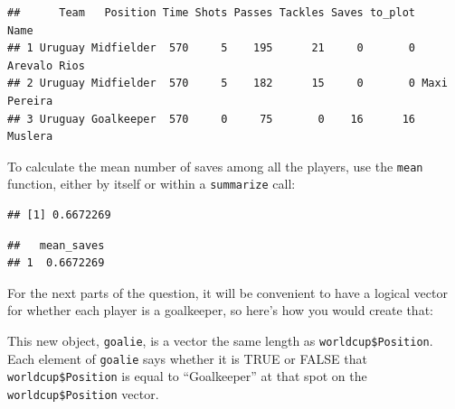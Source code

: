 \documentclass[]{book}
\makeatletter
\newenvironment{Shaded}{\begin{snugshade}}{\end{snugshade}}
\newcommand{\KeywordTok}[1]{\textcolor[rgb]{0.13,0.29,0.53}{\textbf{#1}}}
\newcommand{\DataTypeTok}[1]{\textcolor[rgb]{0.13,0.29,0.53}{#1}}
\newcommand{\StringTok}[1]{\textcolor[rgb]{0.31,0.60,0.02}{#1}}
\newcommand{\OperatorTok}[1]{\textcolor[rgb]{0.81,0.36,0.00}{\textbf{#1}}}
\newcommand{\NormalTok}[1]{#1}
\newenvironment{kframe}{%
\medskip{}
\setlength{\fboxsep}{.8em}
 \def\at@end@of@kframe{}%
 \ifinner\ifhmode%
  \def\at@end@of@kframe{\end{minipage}}%
  \begin{minipage}{\columnwidth}%
 \fi\fi%
 \def\FrameCommand##1{\hskip\@totalleftmargin \hskip-\fboxsep
 \colorbox{shadecolor}{##1}\hskip-\fboxsep
     \hskip-\linewidth \hskip-\@totalleftmargin \hskip\columnwidth}%
 \MakeFramed {\advance\hsize-\width
   \@totalleftmargin\z@ \linewidth\hsize
   \@setminipage}}%
 {\par\unskip\endMakeFramed%
 \at@end@of@kframe}
\renewenvironment{Shaded}{\begin{kframe}}{\end{kframe}}
\theoremstyle{definition}
\theoremstyle{definition}
\theoremstyle{definition}
\theoremstyle{remark}
\makeatother
\begin{document}
\begin{verbatim}
##      Team   Position Time Shots Passes Tackles Saves to_plot         Name
## 1 Uruguay Midfielder  570     5    195      21     0       0 Arevalo Rios
## 2 Uruguay Midfielder  570     5    182      15     0       0 Maxi Pereira
## 3 Uruguay Goalkeeper  570     0     75       0    16      16      Muslera
\end{verbatim}

To calculate the mean number of saves among all the players, use the
\texttt{mean} function, either by itself or within a \texttt{summarize}
call:

\begin{Shaded}
\end{Shaded}

\begin{verbatim}
## [1] 0.6672269
\end{verbatim}

\begin{Shaded}
\end{Shaded}

\begin{verbatim}
##   mean_saves
## 1  0.6672269
\end{verbatim}

For the next parts of the question, it will be convenient to have a
logical vector for whether each player is a goalkeeper, so here's how
you would create that:

\begin{Shaded}
\end{Shaded}

This new object, \texttt{goalie}, is a vector the same length as
\texttt{worldcup\$Position}. Each element of \texttt{goalie} says
whether it is TRUE or FALSE that \texttt{worldcup\$Position} is equal to
``Goalkeeper'' at that spot on the \texttt{worldcup\$Position} vector.
\end{document}
